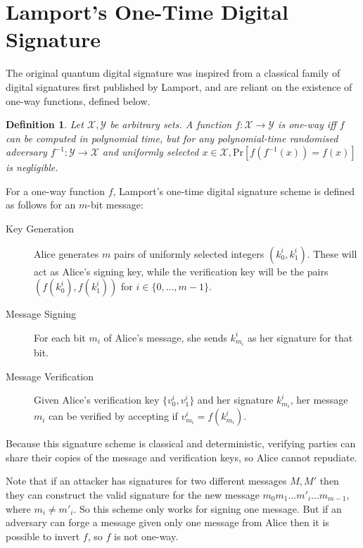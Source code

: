 \documentclass[%
 reprint,
 amsmath,amssymb,
 aps,
 pra,
]{revtex4-1}
\newtheorem{definition}{Definition}[section]
\begin{document}
\section{Lamport's One-Time Digital Signature}
\label{sec:lamport}

The original quantum digital signature was inspired from a classical family of digital signatures first published by Lamport\cite{lamp79}, and are reliant on the existence of one-way functions, defined below.

\begin{definition}
Let $\mathcal{X}, \mathcal{Y}$ be arbitrary sets. A function $f:\mathcal{X} \rightarrow \mathcal{Y}$ is one-way iff $f$ can be computed in polynomial time, but for any polynomial-time randomised adversary $f^{-1}:\mathcal{Y} \rightarrow \mathcal{X}$ and uniformly selected $x \in \mathcal{X}, \mathrm{Pr}[f(f^{-1}(x)) = f(x)]$ is negligible.
\end{definition}

For a one-way function $f$, Lamport's one-time digital signature scheme is defined as follows for an $m$-bit message:

\begin{description}
\item[Key Generation]Alice generates $m$ pairs of uniformly selected integers $(k^i_0, k^i_1)$. These will act as Alice's signing key, while the verification key will be the pairs $(f(k^i_0), f(k^i_1))$ for $i \in \{0,...,m-1\}$.
\item[Message Signing]For each bit $m_i$ of Alice's message, she sends $k^i_{m_i}$ as her signature for that bit.
\item[Message Verification]Given Alice's verification key $\{v^i_0, v^i_1\}$ and her signature $k^i_{m_i}$, her message $m_i$ can be verified by accepting if $v^i_{m_i} = f(k^i_{m_i})$.
\end{description}

Because this signature scheme is classical and deterministic, verifying parties can share their copies of the message and verification keys, so Alice cannot repudiate.

Note that if an attacker has signatures for two different messages $M, M'$ then they can construct the valid signature for the new message $m_0m_1...m'_i...m_{m-1}$, where $m_i \neq m'_i$. So this scheme only works for signing one message. But if an adversary can forge a message given only one message from Alice then it is possible to invert $f$, so $f$ is not one-way.
\end{document}
